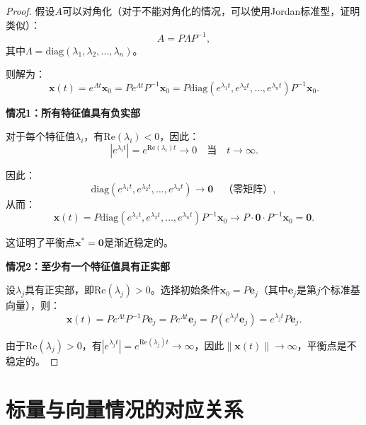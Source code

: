 \documentclass[12pt,a4paper]{article}
\newtheorem{proof}{证明}
\begin{document}
\begin{proof}
假设$A$可以对角化（对于不能对角化的情况，可以使用Jordan标准型，证明类似）：
\begin{equation}
A = P\Lambda P^{-1},
\end{equation}
其中$\Lambda = \text{diag}(\lambda_1, \lambda_2, \ldots, \lambda_n)$。

则解为：
\begin{equation}
\mathbf{x}(t) = e^{At}\mathbf{x}_0 = Pe^{\Lambda t}P^{-1}\mathbf{x}_0 = P\text{diag}(e^{\lambda_1 t}, e^{\lambda_2 t}, \ldots, e^{\lambda_n t})P^{-1}\mathbf{x}_0.
\end{equation}

\textbf{情况1：所有特征值具有负实部}

对于每个特征值$\lambda_i$，有$\text{Re}(\lambda_i) < 0$，因此：
\begin{equation}
|e^{\lambda_i t}| = e^{\text{Re}(\lambda_i) t} \to 0 \quad \text{当} \quad t \to \infty.
\end{equation}

因此：
\begin{equation}
\text{diag}(e^{\lambda_1 t}, e^{\lambda_2 t}, \ldots, e^{\lambda_n t}) \to \mathbf{0} \quad \text{（零矩阵）},
\end{equation}
从而：
\begin{equation}
\mathbf{x}(t) = P\text{diag}(e^{\lambda_1 t}, e^{\lambda_2 t}, \ldots, e^{\lambda_n t})P^{-1}\mathbf{x}_0 \to P \cdot \mathbf{0} \cdot P^{-1}\mathbf{x}_0 = \mathbf{0}.
\end{equation}

这证明了平衡点$\mathbf{x}^* = \mathbf{0}$是渐近稳定的。

\textbf{情况2：至少有一个特征值具有正实部}

设$\lambda_j$具有正实部，即$\text{Re}(\lambda_j) > 0$。选择初始条件$\mathbf{x}_0 = P\mathbf{e}_j$（其中$\mathbf{e}_j$是第$j$个标准基向量），则：
\begin{equation}
\mathbf{x}(t) = Pe^{\Lambda t}P^{-1}P\mathbf{e}_j = Pe^{\Lambda t}\mathbf{e}_j = P(e^{\lambda_j t}\mathbf{e}_j) = e^{\lambda_j t}P\mathbf{e}_j.
\end{equation}

由于$\text{Re}(\lambda_j) > 0$，有$|e^{\lambda_j t}| = e^{\text{Re}(\lambda_j) t} \to \infty$，因此$\|\mathbf{x}(t)\| \to \infty$，平衡点是不稳定的。
\end{proof}

\section{标量与向量情况的对应关系}
\end{document}
